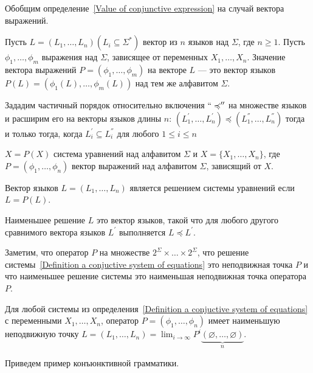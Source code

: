 Обобщим определение~\ref{Value of conjunctive expression} на случай вектора выражений.

\begin{definition}
    Пусть $L = (L_1,\ldots,L_n) (L_i \subseteq \Sigma^*)$ вектор из $n$ языков над $\Sigma$, где $n \geqslant 1$. Пусть $\phi_1,\ldots,\phi_m$ выражения над $\Sigma$, зависящее от переменных $X_1,\ldots,X_n$. Значение вектора выражений $P = (\phi_1,\ldots,\phi_m)$ на векторе $L$ --- это вектор языков $P(L) = (\phi_1(L),\ldots,\phi_m(L))$ над тем же алфавитом $\Sigma$. 
\end{definition}

Зададим частичный порядок относительно включения $``\preccurlyeq''$ на множестве языков и расширим его на векторы языков длины $n$: $(L_1^{'},\ldots,L_n^{'})\preccurlyeq(L_1^{''},\ldots,L_n^{''})$ тогда и только тогда, когда $L_i^{'} \subseteq L_i^{''}$ для любого $1\leqslant i \leqslant n$

\begin{definition}\label{Definition a conjuctive system of equations}
   $X = P(X)$ система уравнений над алфавитом $\Sigma$ и $X = \{X_1,\ldots,X_n\}$, где $P = (\phi_1,\ldots,\phi_n)$ вектор выражений над алфавитом $\Sigma$, зависящий от $X$.
   
   Вектор языков $L = (L_1,\ldots,L_n)$ является решением системы уравнений если $L = P(L)$.
   
   Наименьшее решение $L$ это вектор языков, такой что для любого другого сравнимого вектора языков $L^{'}$ выполняется $L \preccurlyeq L^{'}$.
\end{definition}

Заметим, что оператор $P$ на множестве $2^{\Sigma}\times\ldots\times2^{\Sigma}$, что решение системы~\ref{Definition a conjuctive system of equations} это неподвижная точка $P$ и что наименьшее решение системы это наименьшая неподвижная точка оператора $P$.

\begin{theorem}\label{Theorem of a least fixed point solution}
    Для любой системы из определения~\ref{Definition a conjuctive system of equations} с переменными $X_1,\ldots,X_n$, оператор $P = (\phi_1,\ldots,\phi_n)$ имеет наименьшую неподвижную точку $L = (L_1,\ldots,L_n) = \lim_{i\to\infty}P^{i}\underbrace{(\varnothing,\ldots,\varnothing)}_n$.
\end{theorem}

Приведем пример конъюнктивной грамматики.

